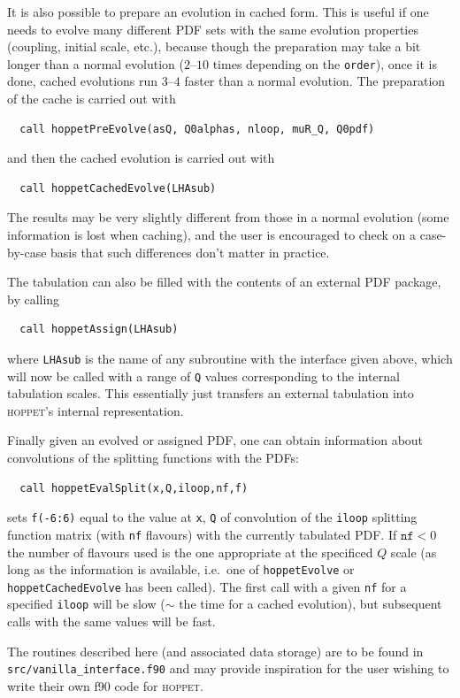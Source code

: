\documentclass[12pt]{article}
\newcommand{\ie}{i.e.\ }
\newcommand{\hoppet}{\textsc{hoppet}\xspace}
\newcommand{\ttt}[1]{\texttt{#1}}
\begin{document}
It is also possible to prepare an evolution in cached form. This is
useful if one needs to evolve many different PDF sets with the same
evolution properties (coupling, initial scale, etc.), because though
the preparation may take a bit longer than a normal evolution
($2$--$10$ times depending on the \ttt{order}), once it is done,
cached evolutions run $3$--$4$ faster than a normal evolution. The
preparation of the cache is carried out with
\begin{verbatim}
  call hoppetPreEvolve(asQ, Q0alphas, nloop, muR_Q, Q0pdf)
\end{verbatim}
and then the cached evolution is carried out with 
\begin{verbatim}
  call hoppetCachedEvolve(LHAsub)
\end{verbatim}
The results may be very slightly different from those in a normal
evolution (some information is lost when caching), and the user is
encouraged to check on a case-by-case basis that such differences
don't matter in practice.

The tabulation can also be filled with the contents of an external PDF
package, by calling
\begin{verbatim}
  call hoppetAssign(LHAsub)
\end{verbatim}
where \ttt{LHAsub} is the name of any subroutine with the interface
given above, which will now be called with a range of \ttt{Q} values
corresponding to the internal tabulation scales. This essentially just
transfers an external tabulation into \hoppet's internal
representation. 

Finally given an evolved or assigned PDF, one can obtain information
about convolutions of the splitting functions with the PDFs:
\begin{verbatim}
  call hoppetEvalSplit(x,Q,iloop,nf,f)
\end{verbatim}
sets \ttt{f(-6:6)} equal to the value at \ttt{x}, \ttt{Q} of
convolution of the \ttt{iloop} splitting function matrix (with
\ttt{nf} flavours) with the currently tabulated PDF. If $\ttt{nf}<0$
the number of flavours used is the one appropriate at the specificed
$Q$ scale (as long as the information is available, \ie one of
\ttt{hoppetEvolve} or \ttt{hoppetCachedEvolve} has been called). The
first call with a given \ttt{nf} for a specified \ttt{iloop} will be
slow ($\sim$ the time for a cached evolution), but subsequent calls
with the same values will be fast.

The routines described here (and associated data storage) are to be
found in \ttt{src/vanilla\_interface.f90} and may provide inspiration
for the user wishing to write their own f90 code for \hoppet.
\end{document}
